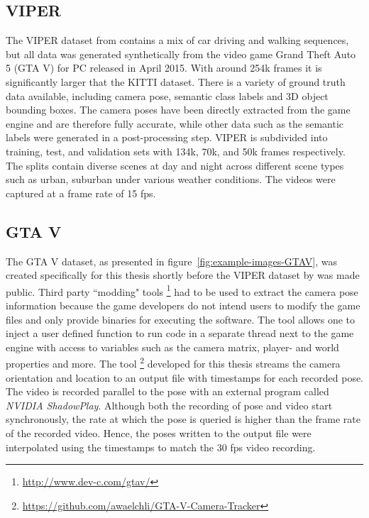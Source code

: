 		\subsection{VIPER}
			The VIPER dataset from \cite{richter2017playing} contains a mix of car driving and walking sequences, but all data was generated synthetically from the video game Grand Theft Auto 5 (GTA V) for PC released in April 2015.
			With around 254k frames it is significantly larger that the KITTI dataset.
			There is a variety of ground truth data available, including camera pose, semantic class labels and 3D object bounding boxes.
			The camera poses have been directly extracted from the game engine and are therefore fully accurate, while other data such as the semantic labels were generated in a post-processing step.
			VIPER is subdivided into training, test, and validation sets with 134k, 70k, and 50k frames respectively.
			The splits contain diverse scenes at day and night across different scene types such as urban, suburban under various weather conditions.
			The videos were captured at a frame rate of 15 fps.
			
		\subsection{GTA V}
			The GTA V dataset, as presented in figure~\ref{fig:example-images-GTAV}, was created specifically for this thesis shortly before the VIPER dataset by \citeauthor{richter2017playing} was made public.
			Third party ``modding" tools%
			\footnote{\url{http://www.dev-c.com/gtav/}}
			had to be used to extract the camera pose information because the game developers do not intend users to modify the game files and only provide binaries for executing the software.
			The tool allows one to inject a user defined \CC\@ function to run code in a separate thread next to the game engine with access to variables such as the camera matrix, player- and world properties and more.
			The tool%
			\footnote{\url{https://github.com/awaelchli/GTA-V-Camera-Tracker}} 
			developed for this thesis streams the camera orientation and location to an output file with timestamps for each recorded pose.
			The video is recorded parallel to the pose with an external program called \emph{NVIDIA ShadowPlay}.
			Although both the recording of pose and video start synchronously, the rate at which the pose is queried is higher than the frame rate of the recorded video.
			Hence, the poses written to the output file were interpolated using the timestamps to match the 30 fps video recording.
			
